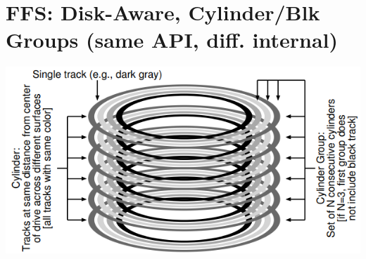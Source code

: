 \section*{FFS: Disk-Aware, Cylinder/Blk Groups (same API, diff. internal)}
\includegraphics[width=\linewidth]{imgs/ffs_cylinder}
